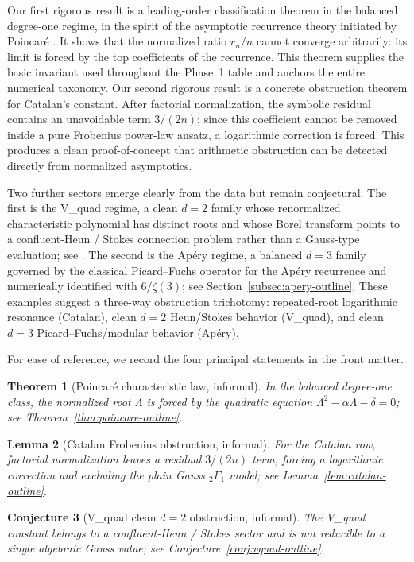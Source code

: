 \documentclass[11pt]{article}
\newtheorem{theorem}{Theorem}[section]
\newtheorem{lemma}[theorem]{Lemma}
\newtheorem{conjecture}[theorem]{Conjecture}
\begin{document}
Our first rigorous result is a leading-order classification theorem in the balanced degree-one regime, in the spirit of the asymptotic recurrence theory initiated by Poincar\'e \cite{poincare1885}. It shows that the normalized ratio $r_n/n$ cannot converge arbitrarily: its limit is forced by the top coefficients of the recurrence. This theorem supplies the basic invariant used throughout the Phase~1 table and anchors the entire numerical taxonomy. Our second rigorous result is a concrete obstruction theorem for Catalan's constant. After factorial normalization, the symbolic residual contains an unavoidable term $3/(2n)$; since this coefficient cannot be removed inside a pure Frobenius power-law ansatz, a logarithmic correction is forced. This produces a clean proof-of-concept that arithmetic obstruction can be detected directly from normalized asymptotics.

Two further sectors emerge clearly from the data but remain conjectural. The first is the V\_quad regime, a clean $d=2$ family whose renormalized characteristic polynomial has distinct roots and whose Borel transform points to a confluent-Heun / Stokes connection problem rather than a Gauss-type evaluation; see \cite{ronveaux1995}. The second is the Ap\'ery regime, a balanced $d=3$ family governed by the classical Picard--Fuchs operator for the Ap\'ery recurrence and numerically identified with $6/\zeta(3)$; see Section~\ref{subsec:apery-outline}. These examples suggest a three-way obstruction trichotomy: repeated-root logarithmic resonance (Catalan), clean $d=2$ Heun/Stokes behavior (V\_quad), and clean $d=3$ Picard--Fuchs/modular behavior (Ap\'ery).

For ease of reference, we record the four principal statements in the front matter.

\begin{theorem}[Poincar\'e characteristic law, informal]
In the balanced degree-one class, the normalized root $\Lambda$ is forced by the quadratic equation $\Lambda^2-\alpha\Lambda-\delta=0$; see Theorem~\ref{thm:poincare-outline}.
\end{theorem}

\begin{lemma}[Catalan Frobenius obstruction, informal]
For the Catalan row, factorial normalization leaves a residual $3/(2n)$ term, forcing a logarithmic correction and excluding the plain Gauss ${}_2F_1$ model; see Lemma~\ref{lem:catalan-outline}.
\end{lemma}

\begin{conjecture}[V\_quad clean $d=2$ obstruction, informal]
The V\_quad constant belongs to a confluent-Heun / Stokes sector and is not reducible to a single algebraic Gauss value; see Conjecture~\ref{conj:vquad-outline}.
\end{conjecture}
\end{document}
